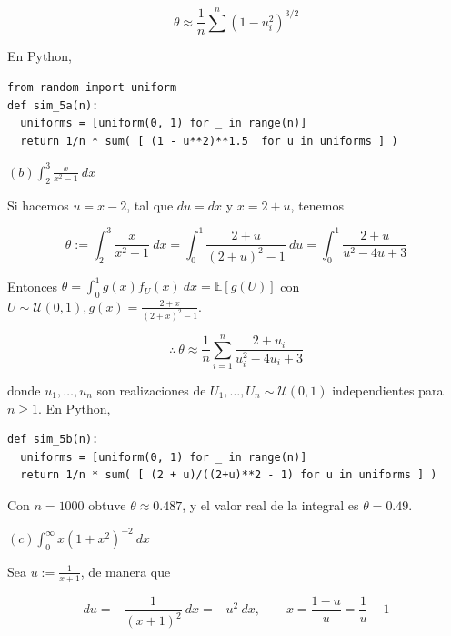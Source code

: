 \documentclass[a4paper, 12pt]{article}
\begin{document}
\begin{equation*}
  \theta \approx \frac{1}{n} \sum^n (1 - u_i^2)^{3 / 2}
\end{equation*}

En Python,

\begin{verbatim}
from random import uniform
def sim_5a(n):
  uniforms = [uniform(0, 1) for _ in range(n)]
  return 1/n * sum( [ (1 - u**2)**1.5  for u in uniforms ] )

\end{verbatim}

\pagebreak


\begin{myframe}
$(b) \int_2^3 \frac{x}{x^2-1} ~ dx$
\end{myframe}


Si hacemos $u = x - 2$, tal que $du = dx$ y $x = 2 + u$, tenemos 

\begin{equation*}
  \theta := \int_2^3 \frac{x}{x^2 - 1} ~ dx = \int_0^1 \frac{2+u}{(2+u)^2 - 1} ~ du =
  \int_0^1 \frac{2+u}{u^2 - 4u + 3}
\end{equation*}

Entonces $\theta = \int_0^1 g(x)f_U(x) ~ dx = \mathbb{E}\left[ g(U) \right] $
con $U \sim \mathcal{U}(0, 1), g(x) = \frac{2+x}{(2+x)^2 - 1}$. 

\begin{equation*}
  \therefore ~ \theta \approx \frac{1}{n}\sum_{i=1}^n \frac{2 + u_i}{u_i^2
  -4u_i + 3}
\end{equation*}

donde $u_1, \ldots, u_n$ son realizaciones de $U_1, \ldots, U_n \sim
\mathcal{U}(0, 1)$ independientes para $n \geq 1$. En Python, 

  
\begin{verbatim}
def sim_5b(n):
  uniforms = [uniform(0, 1) for _ in range(n)]
  return 1/n * sum( [ (2 + u)/((2+u)**2 - 1) for u in uniforms ] )
\end{verbatim}

Con $n = 1000$ obtuve $\theta \approx 0.487$, y el valor real de la integral es $\theta = 0.49$.

\pagebreak

\begin{myframe}
$(c) \int_0^\infty x(1+x^2)^{-2} ~ dx$
\end{myframe}


Sea $u := \frac{1}{x + 1}$, de manera que 

\begin{equation*}
  du = -\frac{1}{(x+1)^2} ~ dx = -u^2 ~ dx, \qquad x = \frac{1-u}{u} =
  \frac{1}{u} - 1
\end{equation*}
\end{document}
